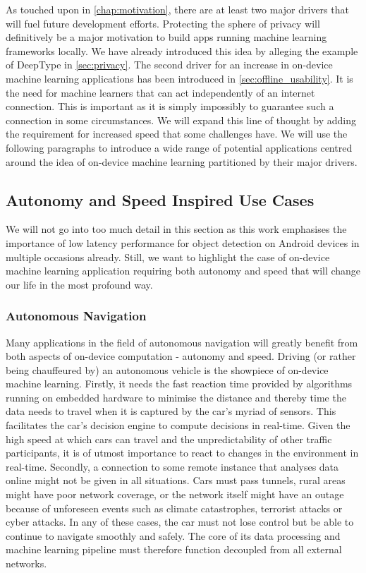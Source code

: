 \documentclass[
			   fontsize=11pt,
               paper=a4,
               bibliography=totoc,
               idxtotoc,
               headsepline,
               footsepline,
               footinclude=false,
               BCOR=12mm,
               DIV=13,
               openany,   %
               ]
               {scrbook}
\begin{document}
As touched upon in \autoref{chap:motivation}, there are at least two major drivers that will fuel future development efforts. Protecting the sphere of privacy will definitively be a major motivation to build apps running machine learning frameworks locally. We have already introduced this idea by alleging the example of DeepType in \autoref{sec:privacy}. The second driver for an increase in on-device machine learning applications has been introduced in \autoref{sec:offline_usability}. It is the need for machine learners that can act independently of an internet connection. This is important as it is simply impossibly to guarantee such a connection in some circumstances. We will expand this line of thought by adding the requirement for increased speed that some challenges have. We will use the following paragraphs to introduce a wide range of potential applications centred around the idea of on-device machine learning partitioned by their major drivers.

\subsection{Autonomy and Speed Inspired Use Cases}

We will not go into too much detail in this section as this work emphasises the importance of low latency performance for object detection on Android devices in multiple occasions already. Still, we want to highlight the case of on-device machine learning application requiring both autonomy and speed that will change our life in the most profound way.

\subsubsection{Autonomous Navigation}
Many applications in the field of autonomous navigation will greatly benefit from both aspects of on-device computation - autonomy and speed. Driving (or rather being chauffeured by) an autonomous vehicle is the showpiece of on-device machine learning. Firstly, it needs the fast reaction time provided by algorithms running on embedded hardware to minimise the distance and thereby time the data needs to travel when it is captured by the car's myriad of sensors. This facilitates the car's decision engine to compute decisions in real-time. Given the high speed at which cars can travel and the unpredictability of other traffic participants, it is of utmost importance to react to changes in the environment in real-time. Secondly, a connection to some remote instance that analyses data online might not be given in all situations. Cars must pass tunnels, rural areas might have poor network coverage, or the network itself might have an outage because of unforeseen events such as climate catastrophes, terrorist attacks or cyber attacks. In any of these cases, the car must not lose control but be able to continue to navigate smoothly and safely. The core of its data processing and machine learning pipeline must therefore function decoupled from all external networks. \\
\end{document}
